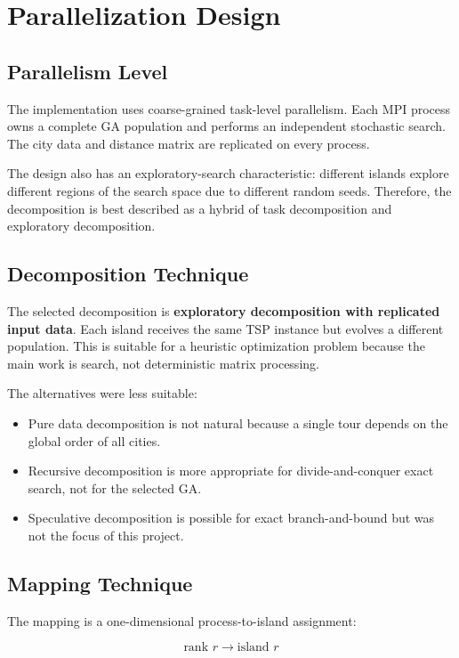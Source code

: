 \documentclass[11pt,a4paper]{article}
\begin{document}
\section{Parallelization Design}

\subsection{Parallelism Level}
The implementation uses coarse-grained task-level parallelism. Each MPI process
owns a complete GA population and performs an independent stochastic search.
The city data and distance matrix are replicated on every process.

The design also has an exploratory-search characteristic: different islands
explore different regions of the search space due to different random seeds.
Therefore, the decomposition is best described as a hybrid of task decomposition
and exploratory decomposition.

\subsection{Decomposition Technique}
The selected decomposition is \textbf{exploratory decomposition with replicated
input data}. Each island receives the same TSP instance but evolves a different
population. This is suitable for a heuristic optimization problem because the
main work is search, not deterministic matrix processing.

The alternatives were less suitable:

\begin{itemize}[leftmargin=*]
  \item Pure data decomposition is not natural because a single tour depends on
  the global order of all cities.
  \item Recursive decomposition is more appropriate for divide-and-conquer exact
  search, not for the selected GA.
  \item Speculative decomposition is possible for exact branch-and-bound but was
  not the focus of this project.
\end{itemize}

\subsection{Mapping Technique}
The mapping is a one-dimensional process-to-island assignment:

\[
  \text{rank } r \longrightarrow \text{island } r
\]
\end{document}
